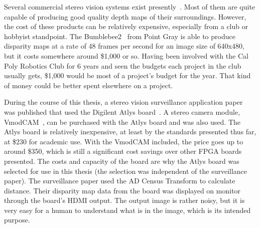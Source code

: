 Several commercial stereo vision systems exist presently~\cite{xilinxSpartan3APaper}. Most of them are quite capable of producing good quality depth maps of their surroundings. However, the cost of these products can be relatively expensive, especially from a club or hobbyist standpoint. The Bumblebee2~\cite{bumblebee} from Point Gray is able to produce disparity maps at a rate of 48 frames per second for an image size of 640x480, but it costs somewhere around \$1,000 or so. Having been involved with the Cal Poly Robotics Club for 6 years and seen the budgets each project in the club usually gets, \$1,000 would be most of a project's budget for the year. That kind of money could be better spent elsewhere on a project.

During the course of this thesis, a stereo vision surveillance application paper~\cite{surveillance} was published that used the Digilent Atlys board~\cite{atlysBoard}. A stereo camera module, VmodCAM~\cite{vmodcam}, can be purchased with the Atlys board and was also used. The Atlys board is relatively inexpensive, at least by the standards presented thus far, at \$230 for academic use. With the VmodCAM included, the price goes up to around \$350, which is still a significant cost savings over other FPGA boards presented. The costs and capacity of the board are why the Atlys board was selected for use in this thesis (the selection was independent of the surveillance paper). The surveillance paper used the AD Census Transform to calculate distance. Their disparity map data from the board was displayed on monitor through the board's HDMI output. The output image is rather noisy, but it is very easy for a human to understand what is in the image, which is its intended purpose.